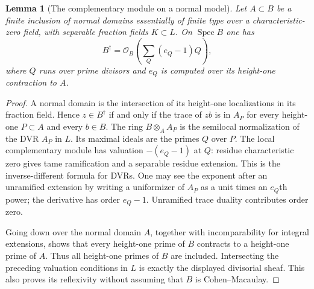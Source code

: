 \documentclass[11pt,reqno]{amsart}
\numberwithin{equation}{section}
\newtheorem{lemma}[theorem]{Lemma}
\theoremstyle{definition}\newtheorem{definition}[theorem]{Definition}
\theoremstyle{remark}\newtheorem{remark}[theorem]{Remark}
\newcommand{\OO}{\mathcal O}\newcommand{\II}{\mathcal I}
\begin{document}
\begin{lemma}[The complementary module on a normal model]
\label{lem:normal-complementary-v171}
Let $A\subset B$ be a finite inclusion of normal domains essentially of
finite type over a characteristic-zero field, with separable fraction
fields $K\subset L$. On $\operatorname{Spec}B$ one has
\[
 B^\dagger=\OO_B\left(\sum_Q(e_Q-1)Q\right),
\]
where $Q$ runs over prime divisors and $e_Q$ is computed over its
height-one contraction to $A$.
\end{lemma}
\begin{proof}
A normal domain is the intersection of its height-one localizations in
its fraction field. Hence $z\in B^\dagger$ if and only if the trace of
$zb$ is in $A_P$ for every height-one $P\subset A$ and every $b\in B$.
The ring $B\otimes_A A_P$ is the semilocal normalization of the DVR
$A_P$ in $L$. Its maximal ideals are the primes $Q$ over $P$.
The local complementary module has valuation $-(e_Q-1)$ at $Q$:
residue characteristic zero gives tame ramification and a separable
residue extension. This is the inverse-different formula for DVRs.
One may see the exponent after an unramified extension by writing a
uniformizer of $A_P$ as a unit times an $e_Q$th power; the derivative
has order $e_Q-1$. Unramified trace duality contributes order zero.

Going down over the normal domain $A$, together with incomparability
for integral extensions, shows that every height-one prime of $B$
contracts to a height-one prime of $A$. Thus all height-one primes
of $B$ are included. Intersecting the preceding valuation conditions in $L$
is exactly the displayed divisorial sheaf. This also proves its
reflexivity without assuming that $B$ is Cohen--Macaulay.
\end{proof}
\end{document}
